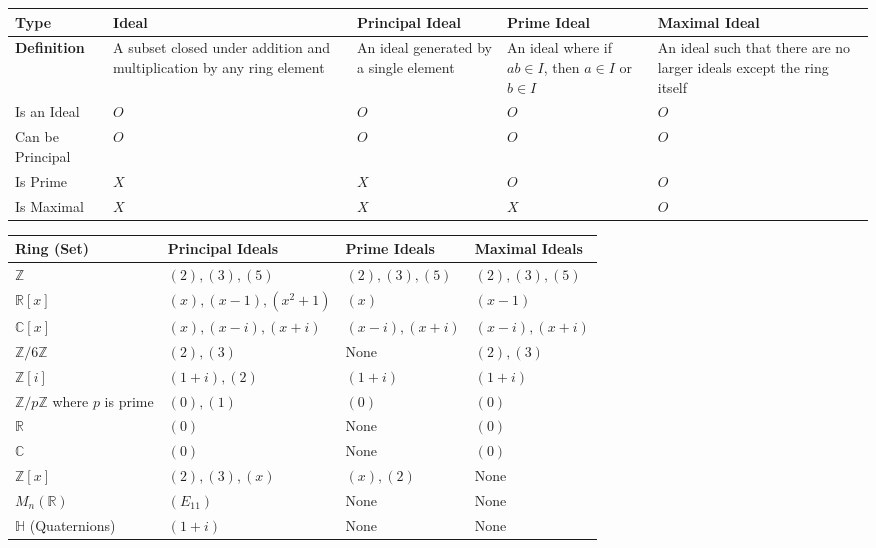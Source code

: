 \documentclass[11pt,openany]{article}
\begin{document}
\begin{center}
\begin{tabular}{|>{\centering\arraybackslash}m{4cm}|>{\centering\arraybackslash}m{2cm}|>{\centering\arraybackslash}m{2cm}|>{\centering\arraybackslash}m{2cm}|>{\centering\arraybackslash}m{2cm}|}
	\hline
	\textbf{Type} & \textbf{Ideal} & \textbf{Principal Ideal} & \textbf{Prime Ideal} & \textbf{Maximal Ideal} \\
	\hline
	\textbf{Definition} & A subset closed under addition and multiplication by any ring element & An ideal generated by a single element & An ideal where if \(ab \in I\), then \(a \in I\) or \(b \in I\) & An ideal such that there are no larger ideals except the ring itself \\
	\hline
	Is an Ideal & \(O\) & \(O\) & \(O\) & \(O\) \\
	\hline
	Can be Principal & \(O\) & \(O\) & \(O\) & \(O\) \\
	\hline
	Is Prime & \(X\) & \(X\) & \(O\) & \(O\) \\
	\hline
	Is Maximal & \(X\) & \(X\) & \(X\) & \(O\) \\
	\hline
\end{tabular}
\end{center}

\begin{center}
\begin{tabular}{|>{\centering\arraybackslash}m{4cm}|>{\centering\arraybackslash}m{3cm}|>{\centering\arraybackslash}m{3cm}|>{\centering\arraybackslash}m{3cm}|}
	\hline
	\textbf{Ring (Set)} & \textbf{Principal Ideals} & \textbf{Prime Ideals} & \textbf{Maximal Ideals} \\
	\hline
	\(\mathbb{Z}\) & \((2), (3), (5)\) & \((2), (3), (5)\) & \((2), (3), (5)\) \\
	\hline
	\(\mathbb{R}[x]\) & \((x), (x-1), (x^2+1)\) & \((x)\) & \((x-1)\) \\
	\hline
	\(\mathbb{C}[x]\) & \((x), (x-i), (x+i)\) & \((x-i), (x+i)\) & \((x-i), (x+i)\) \\
	\hline
	\(\mathbb{Z}/6\mathbb{Z}\) & \((2), (3)\) & None & \((2), (3)\) \\
	\hline
	\(\mathbb{Z}[i]\) & \((1+i), (2)\) & \((1+i)\) & \((1+i)\) \\
	\hline
	\(\mathbb{Z}/p\mathbb{Z}\) where \(p\) is prime & \((0), (1)\) & \((0)\) & \((0)\) \\
	\hline
	\(\mathbb{R}\) & \((0)\) & None & \((0)\) \\
	\hline
	\(\mathbb{C}\) & \((0)\) & None & \((0)\) \\
	\hline
	\(\mathbb{Z}[x]\) & \((2), (3), (x)\) & \((x), (2)\) & None \\
	\hline
	\(M_n(\mathbb{R})\) & \((E_{11})\) & None & None \\
	\hline
	\(\mathbb{H}\) (Quaternions) & \((1+i)\) & None & None \\
	\hline
\end{tabular}
\end{center}
\end{document}
